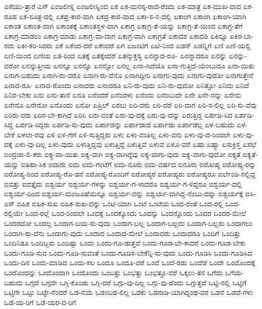 {ಎಸೆಯು-ತ್ತಾರೆ
ಎಸ್
ಏಂಜಲೀಸ್ನ
ಏಂಜಲೀಸ್ನಿಂದ
ಏಕ
ಏಕ-ಮನಸ್ಕ-ರಾದ-ರೆಂದು
ಏಕ-ಮಾತ್ರ
ಏಕ-ಮುಖ-ವಾದ
ಏಕ-ರೂಪ
ಏಕ-ಸೂತ್ರ-ದಲ್ಲಿ
ಏಕಪ್ರ-ಕಾರ-ವಾಗಿ
ಏಕಪ್ರ-ಕಾರ-ವಾದ
ಏಕಾ-ಸ-ನ-ದಲ್ಲಿ
ಏಕಾಂಗ
ಏಕಾಂಗಿ
ಏಕಾಂಗಿ-ಯಾಗಿ
ಏಕಾಂತ
ಏಕಾಂತ-ವಾಗಿ
ಏಕಾಂತಕ್ಕೆ
ಏಕಾಂತಸ್ಥಳ-ವಾಗಿ
ಏಕಾಗ್ರ
ಏಕಾಗ್ರ-ತೆ-ಯನ್ನು
ಏಕಾಗ್ರ-ತೆ-ಯಿಂದ
ಏಕಾಗ್ರ-ತೆಗೆ
ಏಕಾಗ್ರ-ಮಾಡಲು
ಏಕಾಗ್ರ-ಮಾಡು
ಏಕಾಗ್ರ-ವಾ-ದಾಗ
ಏಕಾಗ್ರ-ವಾಗಿ
ಏಕಾಗ್ರತೆ
ಏಕಾದಶ
ಏಕಾದಶಿ
ಏಕಿನ್ನೂ
ಏಕಿರ-ಬಾ-ರದು
ಏಕೀ-ಕರಿ-ಸಿದರು
ಏಕೆ
ಏಕೆಂದ-ದರೆ
ಏಕೆಂದರೆ
ಏಗ
ಏಜಂಟಿಗೆ
ಏಟಿ-ನಿಂದ
ಏಡನ್
ಏಡನ್ನಿಗೆ
ಏಣಿ
ಏಣಿ-ಯಲ್ಲಿ
ಏಣಿ-ಯಿಂದ
ಏಣಿಯ
ಏತ-ರಿಂದ
ಏತಕ್ಕೆ
ಏತಕ್ಕೆಂದರೆ
ಏತನ್ಮುಕ್ತಸ್ಯ
ಏನನ್ನಾದ-ರೂ-
ಏನನ್ನಾದರೂ
ಏನನ್ನು
ಏನನ್ನು-ವರೋ
ಏನನ್ನುತ್ತೀಯ
ಏನನ್ನೂ
ಏನನ್ನೊ
ಏನನ್ನೋ
ಏನಲ್ಲ
ಏನಾ-ಗಿದೆಯೊ
ಏನಾ-ಗುತ್ತಿದೆ-ಯೆಂಬುದೂ
ಏನಾ-ಯಿತು
ಏನಾಗ-ಬಹುದು
ಏನಾಗಿ-ರು-ವರೊ
ಏನಾಗಿ-ರು-ವೆನೊ
ಏನಾಗಿದ್ದೀರಿ
ಏನಾಗು-ವುದು
ಏನಾಗು-ವುದೋ
ಏನಾಗುತ್ತೇನೆ
ಏನಾದ-ರೂ-
ಏನಾದ-ರೊಂದು
ಏನಾದರು
ಏನಾದರೂ
ಏನಿ-ರು-ವುದು
ಏನಿ-ರು-ವುದೋ
ಏನಿತ್ತೋ
ಏನಿದು
ಏನಿದೆ
ಏನಿರ-ಬೇಕು
ಏನು
ಏನು-ತಾನೆ
ಏನೂ
ಏನೆಂದರೆ
ಏನೆಂದಳು
ಏನೆಂದು
ಏನೆಂಬುದೇ
ಏನೇ
ಏನೇ-ನನ್ನು
ಏನೇನು
ಏನೇನೊ
ಏನೇನೋ
ಏನೊಂದು
ಏನೋ
ಏಪ್ರಿಲ್
ಏರಲು
ಏರಿ-ದರು
ಏರಿ-ದರೆ
ಏರಿ-ದಾಗ
ಏರಿ-ಸ-ಲಿಲ್ಲ
ಏರಿ-ಸು-ವೆವು
ಏರಿರು-ವರು
ಏರಿಸ-ಬೇ-ಕಾಗಿದೆ
ಏರಿಸಿ
ಏರು-ವಂತೆ
ಏರು-ವು-ದಕ್ಕೆ
ಏರು-ವು-ದನ್ನು
ಏರುತ್ತಿದ್ದ
ಏರ್ಪಡಿ-ಸಿದ
ಏರ್ಪಡಿ-ಸಿದ್ದ
ಏರ್ಪಡಿ-ಸಿದ್ದರು
ಏರ್ಪಡಿ-ಸು-ವುದು
ಏರ್ಪಾಡನ್ನು
ಏರ್ಪಾಡಾದ
ಏರ್ಪಾಡು
ಏರ್ಪಾಡೆಲ್ಲ
ಏಳ-ಬಹುದು
ಏಳ-ಬೇಕೆ
ಏಳಲಾ-ರವು
ಏಳಿ
ಏಳಿ-ಗೆಗೆ
ಏಳಿ-ಸುತ್ತಿದ್ದರು
ಏಳು
ಏಳು-ವಂತಿಲ್ಲ
ಏಳು-ವನು
ಏಳು-ವು-ದ-ರಿಂದಲೇ
ಏಳು-ವು-ದಕ್ಕೆ
ಏಳು-ವು-ದಿಲ್ಲ
ಏಳು-ವುದು
ಏಳುತ್ತಿದ್ದವು
ಏಳುತ್ತಿದ್ದೆ
ಏಳುತ್ತಿವೆ
ಏಳುವ
ಏಳೂ-ವರೆ
ಏಷಾ
ಏಷ್ಯಾ
ಏಸುಕ್ರಿಸ್ತ
ಏಸೆಛೆ
ಐಂದ್ರಜಾ-ಲಿ-ಕರು
ಐಕ್ಯ-ವಾ-ಯಿತು
ಐಕ್ಯ-ವಾಗಿ
ಐಕ್ಯ-ವಾಗಿದ್ದೆವು
ಐಕ್ಯ-ವಾಗು-ವುದು
ಐಕ್ಯ-ವಾಗು-ವುದೋ
ಐಕ್ಯತೆ
ಐಕ್ಯತೆ-ಯನ್ನು
ಐತಿಹಾ-ಸಿಕ
ಐದಾರು
ಐದು
ಐದು-ಗಂಟೆಗೆ
ಐದು-ನೂರು
ಐದು-ವರ್ಷದ
ಐನೂರು
ಐರೋಪ್ಯ
ಐರೋಪ್ಯ-ರನ್ನು
ಐರೋಪ್ಯ-ರಿಂದ
ಐರೋಪ್ಯ-ರೊ-ಡನೆ
ಐರೋಪ್ಯ-ರೊಂದಿಗೆ
ಐರೋಪ್ಯರ
ಐರೋಪ್ಯರು
ಐರೋಪ್ಯರೂ
ಐರ್ಲೆಂಡಿ-ನಲ್ಲಿದ್ದ
ಐವತ್ತು
ಐವತ್ತೈದು
ಐಶ್ವರ್ಯ
ಐಶ್ವರ್ಯ-ಗಳನ್ನು
ಐಶ್ವರ್ಯ-ಗ-ಳಾದರೊ
ಐಶ್ವರ್ಯ-ಗ-ಳಿದ್ದರೂ
ಐಶ್ವರ್ಯ-ದಲ್ಲಿ
ಐಶ್ವರ್ಯ-ದಿಂದ
ಐಶ್ವರ್ಯ-ಮಂಜೂಷೆಯಿನ್ನೂ
ಐಶ್ವರ್ಯ-ವನ್ನು
ಐಶ್ವರ್ಯ-ವಾಗಿದ್ದ-ನೆಂಬು-ದನ್ನು
ಐಶ್ವರ್ಯಕ್ಕೆ
ಐಸಿ-ಎಸ್
ಐಹಿಕ
ಐಹಿಕ-ಸುಖ
ಐಹಿಕ-ಸುಖ-ವನ್ನು
ಒಂಟಿ-ಯಾಗಿ
ಒಂಟೆ
ಒಂಟೆಯ
ಒಂದ-ರಂತೆ
ಒಂದ-ರಲ್ಲಿ
ಒಂದ-ರಲ್ಲಿಯೇ
ಒಂದ-ರಲ್ಲೆ
ಒಂದ-ರಿಂದಲೇ
ಒಂದಕ್ಕೆ
ಒಂದಕ್ಕೊಂದು
ಒಂದನ್ನು
ಒಂದನ್ನೊಂದು
ಒಂದರ
ಒಂದರ-ಮೇಲೆ
ಒಂದರದೋ
ಒಂದಲ್ಲ
ಒಂದಾಗ-ಬಯ-ಸು-ವುದು
ಒಂದಾಗ-ಬಲ್ಲ
ಒಂದಾಗ-ಬಲ್ಲದು
ಒಂದಾಗ-ಬಲ್ಲರು
ಒಂದಾಗಲು
ಒಂದಾಗಿ-ರು-ವೆನು
ಒಂದಾಗು-ವುದು
ಒಂದಾದ
ಒಂದಾದ-ಮೇಲೆ
ಒಂದಾದರು
ಒಂದಾದರೂ
ಒಂದಿಗೆ
ಒಂದಿತ್ತು
ಒಂದಿನಿತೂ
ಒಂದಿಬ್ಬರು
ಒಂದಿಷ್ಟು
ಒಂದು
ಒಂದು-ಗೂ-ಡುತ್ತವೆ
ಒಂದು-ಗೂಡ-ಬೇ-ಕಾದರೆ
ಒಂದು-ಗೂಡ-ಬೇಕು
ಒಂದು-ಗೂಡಿ-ಸುವ
ಒಂದು-ಗೂಡಿ-ಸುವಂತೆ
ಒಂದು-ಗೂಡಿಸ-ಬೇಕೆನ್ನಿ-ಸು-ವುದು
ಒಂದು-ಗೂಡಿಸಿ
ಒಂದು-ಗೂಡಿಸಿದ
ಒಂದು-ದಿನ
ಒಂದು-ಮಾಡಿದ
ಒಂದು-ಸಲ
ಒಂದೂ
ಒಂದೂ-ವರೆ
ಒಂದೆ
ಒಂದೆ-ರಡು
ಒಂದೆಡೆ
ಒಂದೇ
ಒಂದೊಂದಕ್ಕೆ
ಒಂದೊಂದನ್ನು
ಒಂದೊಂದಾಗಿ
ಒಂದೊಂದು
ಒಂಬತ್ತು
ಒಂಭತ್ತು
ಒಂಭತ್ತೂ-ವರೆ
ಒಕ್ಕಲು-ತನ
ಒಗೆದು
ಒಗೆಯ-ಬಹುದು
ಒಗ್ಗದೆ
ಒಗ್ಗದೇ
ಒಗ್ಗಿ-ಕೊಂಡು
ಒಗ್ಗಿ-ದರೆ
ಒಗ್ಗು-ವು-ದಿಲ್ಲ
ಒಗ್ಗು-ವು-ದೆಂದು
ಒಗ್ಗುತ್ತದೆ
ಒಟ್ಟಿ-ನಲ್ಲಿ
ಒಟ್ಟಿಗೆ
ಒಟ್ಟಿಗೇ
ಒಟ್ಟು
ಒಟ್ಟೇ-ನೆಂದರೆ
ಒಡ-ನೆಯೆ
ಒಡಂಬಡ-ಲಿಲ್ಲ
ಒಡಕು
ಒಡನಾಡಿ-ಯಾಗಿದ್ದಂಥ-ವರ
ಒಡನೆ
ಒಡವೆ-ಗಳು
ಒಡೆ-ಯ-ರಿಗೆ
ಒಡೆ-ಯರ-ವ-ರಿಗೆ
}
